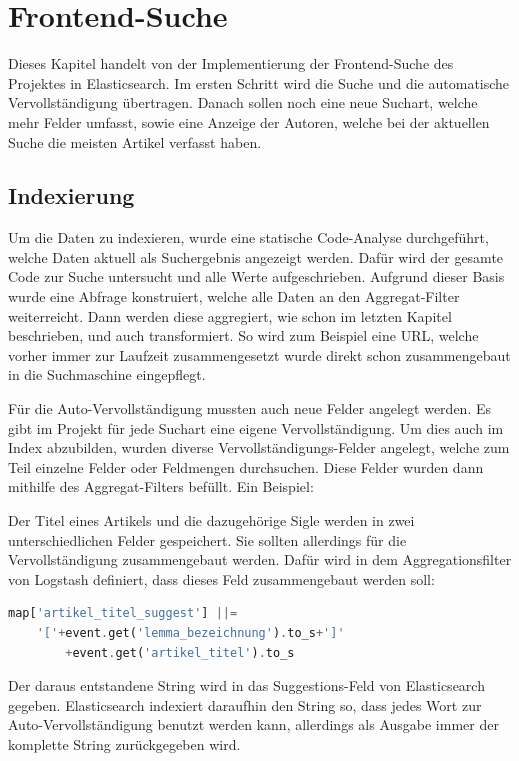 \chapter{Frontend-Suche}

Dieses Kapitel handelt von der Implementierung der Frontend-Suche des Projektes in Elasticsearch. Im ersten Schritt wird die Suche und die automatische Vervollständigung übertragen. Danach sollen noch eine neue Suchart, welche mehr Felder umfasst, sowie eine Anzeige der Autoren, welche bei der aktuellen Suche die meisten Artikel verfasst haben.

\section{Indexierung}

Um die Daten zu indexieren, wurde eine statische Code-Analyse durchgeführt, welche Daten aktuell als Suchergebnis angezeigt werden. Dafür wird der gesamte Code zur Suche untersucht und alle Werte aufgeschrieben. Aufgrund dieser Basis wurde eine Abfrage konstruiert, welche alle Daten an den Aggregat-Filter weiterreicht. Dann werden diese aggregiert, wie schon im letzten Kapitel beschrieben, und auch transformiert. So wird zum Beispiel eine URL, welche vorher immer zur Laufzeit zusammengesetzt wurde direkt schon zusammengebaut in die Suchmaschine eingepflegt. 

Für die Auto-Vervollständigung mussten auch neue Felder angelegt werden. Es gibt im Projekt für jede Suchart eine eigene Vervollständigung. Um dies auch im Index abzubilden, wurden diverse Vervollständigungs-Felder angelegt, welche zum Teil einzelne Felder oder Feldmengen durchsuchen. Diese Felder wurden dann mithilfe des Aggregat-Filters befüllt. Ein Beispiel:

Der Titel eines Artikels und die dazugehörige Sigle werden in zwei unterschiedlichen Felder gespeichert. Sie sollten allerdings für die Vervollständigung zusammengebaut werden. Dafür wird in dem Aggregationsfilter von Logstash definiert, dass dieses Feld zusammengebaut werden soll:

\begin{lstlisting}[language=PHP, frame=single, label={lst:stringConcat}, caption=String-Konkatination im Aggregat Filter von Logstash ,captionpos=b] 
map['artikel_titel_suggest'] ||= 
    '['+event.get('lemma_bezeichnung').to_s+']'
        +event.get('artikel_titel').to_s
\end{lstlisting}
    
Der daraus entstandene String wird in das Suggestions-Feld von Elasticsearch gegeben. Elasticsearch indexiert daraufhin den String so, dass jedes Wort zur Auto-Vervollständigung benutzt werden kann, allerdings als Ausgabe immer der komplette String zurückgegeben wird.

